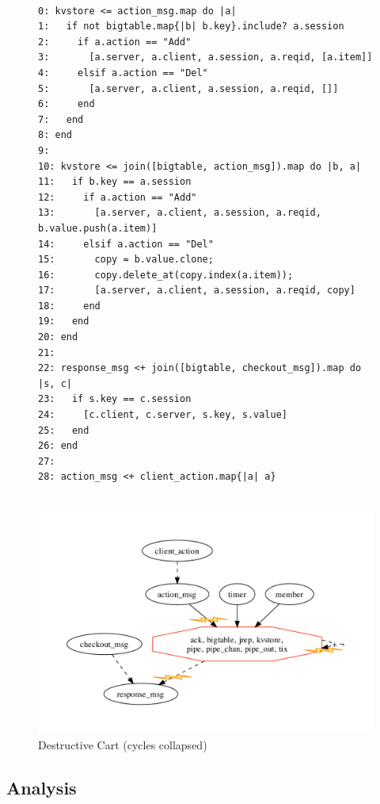 \begin{figure}[t]
\begin{tiny}
\begin{verbatim}

0: kvstore <= action_msg.map do |a|
1:   if not bigtable.map{|b| b.key}.include? a.session
2:     if a.action == "Add"
3:       [a.server, a.client, a.session, a.reqid, [a.item]]
4:     elsif a.action == "Del"
5:       [a.server, a.client, a.session, a.reqid, []]
6:     end
7:   end
8: end
9: 
10: kvstore <= join([bigtable, action_msg]).map do |b, a|
11:   if b.key == a.session
12:     if a.action == "Add"
13:       [a.server, a.client, a.session, a.reqid, b.value.push(a.item)]
14:     elsif a.action == "Del"
15:       copy = b.value.clone;
16:       copy.delete_at(copy.index(a.item));
17:       [a.server, a.client, a.session, a.reqid, copy]
18:     end
19:   end
20: end
21:
22: response_msg <+ join([bigtable, checkout_msg]).map do |s, c|
23:   if s.key == c.session
24:     [c.client, c.server, s.key, s.value]
25:   end
26: end
27: 
28: action_msg <+ client_action.map{|a| a}


\end{verbatim}
\end{tiny}
\centering
\includegraphics[width=0.9\linewidth]{fig/destructive.pdf}

\caption{Destructive Cart (cycles collapsed)}
\label{fig:pdg-destructive}
\end{figure}


\subsection{Analysis}


